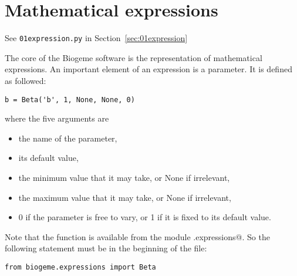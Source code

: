 \documentclass[12pt,a4paper]{article}
\begin{document}
\section{Mathematical expressions}

\begin{flushright}
See \lstinline$01expression.py$ in Section~\ref{sec:01expression}
\end{flushright}

The core of the Biogeme software is the representation of mathematical
expressions.
An important element of an expression is a parameter. It is defined as
followed:

\begin{lstlisting}[style=nonumbers]
b = Beta('b', 1, None, None, 0)
\end{lstlisting}
where the five arguments are
\begin{itemize}
\item the name of the parameter,
\item its default value,
\item the minimum value that it may take, or None if irrelevant,
\item the maximum value that it may take, or None if irrelevant,
  \item 0 if the parameter is free to vary, or 1 if it is fixed to its
    default value.
\end{itemize}
Note that the function \lstinline@Beta@ is available from the module
\lstinline@biogeme.expressions@. So the following statement must be in
the beginning of the file:
\begin{lstlisting}[style=nonumbers]
from biogeme.expressions import Beta
\end{lstlisting}
\end{document}
